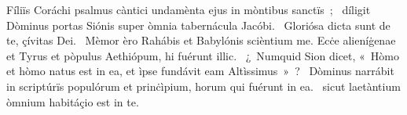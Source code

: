 { Fíliïs Coráchi psalmus càntici}
{%
undamènta ejus in mòntibus sanctïs~; 
~díligit Dòminus portas Siónis super òmnia tabernácula Jacóbi. 
~Gloriósa dicta sunt de te, çívitas Dei. 
~Mèmor èro Rahábis et Babylónis scièntium me. Ecċe alieníġenae et Tyrus et pòpulus Aethiópum, hi fuérunt illic. 
~¿~Numquid Sion dicet, «~Hòmo et hòmo natus est in ea, et ìpse fundávit eam Altìssimus~»~? 
~Dòminus narrábit in scriptúrïs populórum et prinċìpium, horum qui fuérunt in ea. 
~sicut laetàntium òmnium habitáçio est in te. 
}
